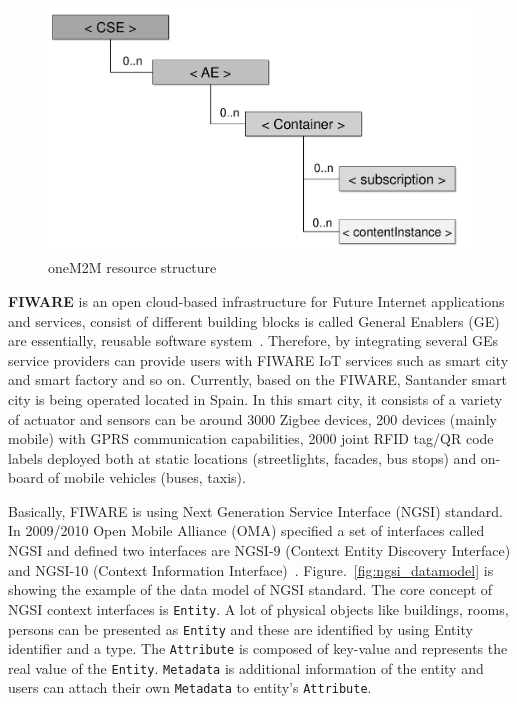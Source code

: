 \begin{figure}[H]			%
	\centering
	\includegraphics[width=\textwidth]{figures/fig_onem2m_resource_structure.pdf}
    \caption{oneM2M resource structure}
    \label{fig:oneM2M_resource_structure}
\end{figure}

\textbf{FIWARE} is an open cloud-based infrastructure for Future Internet applications and services, consist of different building blocks is called General Enablers (GE) are essentially, reusable software system~\cite{fernandez2016smartport}. Therefore, by integrating several GEs service providers can provide users with FIWARE IoT services such as smart city and smart factory and so on. Currently, based on the FIWARE,  Santander smart city is being operated located in Spain.  In this smart city, it consists of a variety of actuator and sensors can be around 3000 Zigbee devices, 200 devices (mainly mobile) with GPRS communication capabilities, 2000 joint RFID tag/QR code labels deployed both at static locations (streetlights, facades, bus stops) and on-board of mobile vehicles (buses, taxis).

Basically, FIWARE is using Next Generation Service Interface (NGSI) standard. In 2009/2010 Open Mobile Alliance (OMA) specified a set of interfaces called NGSI and defined two interfaces are NGSI-9 (Context Entity Discovery Interface) and NGSI-10 (Context Information Interface)~\cite{bauer2017semantic, kovacs2016standards}. Figure.~\ref{fig:ngsi_datamodel} is showing the example of the data model of NGSI standard. The core concept of NGSI context interfaces is \texttt{Entity}. A lot of physical objects like buildings, rooms, persons can be presented as \texttt{Entity} and these are identified by using Entity identifier and a type. The \texttt{Attribute} is composed of key-value and represents the real value of the \texttt{Entity}. \texttt{Metadata} is additional information of the entity and users can attach their own \texttt{Metadata} to entity's \texttt{Attribute}.

